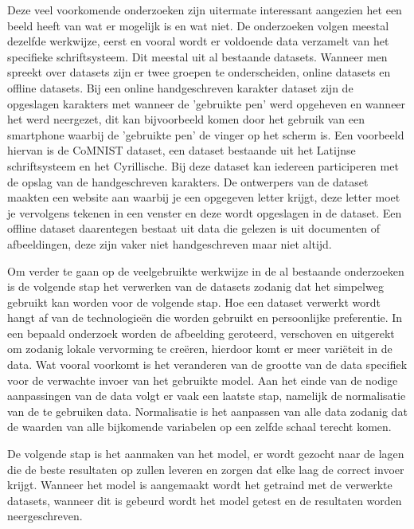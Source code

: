 Deze veel voorkomende onderzoeken zijn uitermate interessant aangezien het een beeld heeft van wat er mogelijk is en wat niet.
De onderzoeken volgen meestal dezelfde werkwijze, eerst en vooral wordt er voldoende data verzamelt van het specifieke schriftsysteem. Dit meestal uit al bestaande datasets.
Wanneer men spreekt over datasets zijn er twee groepen te onderscheiden, online datasets en offline datasets.
Bij een online handgeschreven karakter dataset zijn de opgeslagen karakters met wanneer de 'gebruikte pen' werd opgeheven en wanneer het werd neergezet, dit kan bijvoorbeeld komen door het gebruik van een smartphone waarbij de 'gebruikte pen' de vinger op het scherm is. \autocite{Cheng-Lin2011}
Een voorbeeld hiervan is de CoMNIST dataset, een dataset bestaande uit het Latijnse schriftsysteem en het Cyrillische. Bij deze dataset kan iedereen participeren met de opslag van de handgeschreven karakters.
De ontwerpers van de dataset maakten een website aan waarbij je een opgegeven letter krijgt, deze letter moet je vervolgens tekenen in een venster en deze wordt opgeslagen in de dataset.
Een offline dataset daarentegen bestaat uit data die gelezen is uit documenten of afbeeldingen, deze zijn vaker niet handgeschreven maar niet altijd.

Om verder te gaan op de veelgebruikte werkwijze in de al bestaande onderzoeken is de volgende stap het verwerken van de datasets zodanig dat het simpelweg gebruikt kan worden voor de volgende stap.
Hoe een dataset verwerkt wordt hangt af van de technologieën die worden gebruikt en persoonlijke preferentie.
In een bepaald onderzoek worden de afbeelding geroteerd, verschoven en uitgerekt om zodanig lokale vervorming te creëren, hierdoor komt er meer variëteit in de data. \autocite{Weixin}
Wat vooral voorkomt is het veranderen van de grootte van de data specifiek voor de verwachte invoer van het gebruikte model. \autocite{Aiquan2012} \autocite{Mahbubar2015}
Aan het einde van de nodige aanpassingen van de data volgt er vaak een laatste stap, namelijk de normalisatie van de te gebruiken data.
Normalisatie is het aanpassen van alle data zodanig dat de waarden van alle bijkomende variabelen op een zelfde schaal terecht komen.

De volgende stap is het aanmaken van het model, er wordt gezocht naar de lagen die de beste resultaten op zullen leveren en zorgen dat elke laag de correct invoer krijgt.
Wanneer het model is aangemaakt wordt het getraind met de verwerkte datasets, wanneer dit is gebeurd wordt het model getest en de resultaten worden neergeschreven.

